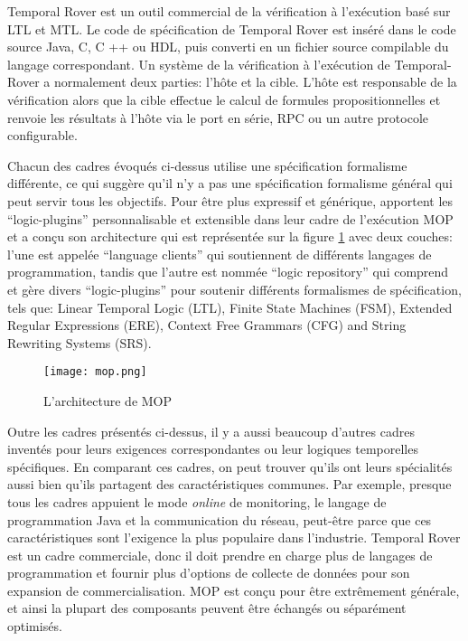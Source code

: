 Temporal Rover \citep{drusinsky2000temporal} est un outil commercial de la vérification à l'exécution basé sur LTL et MTL. Le code de spécification de Temporal Rover est inséré dans le code source Java, C, C ++ ou HDL, puis converti en un fichier source compilable du langage correspondant. Un système de la vérification à l'exécution de Temporal-Rover a normalement deux parties: l'hôte et la cible. L'hôte est responsable de la vérification alors que la cible effectue le calcul de formules propositionnelles et renvoie les résultats à l'hôte via le port en série, RPC ou un autre protocole configurable.

Chacun des cadres évoqués ci-dessus utilise une spécification formalisme différente, ce qui suggère qu'il n'y a pas une spécification formalisme général qui peut servir tous les objectifs. Pour être plus expressif et générique, \cite{chen2007mop} apportent les ``logic-plugins'' personnalisable et extensible dans leur cadre de l'exécution MOP et a conçu son architecture qui est représentée sur la figure \ref{img:mop} avec deux couches: l'une est appelée ``language clients'' qui soutiennent de différents langages de programmation, tandis que l'autre est nommée ``logic repository'' qui comprend et gère divers ``logic-plugins'' pour soutenir différents formalismes de spécification, tels que: Linear Temporal Logic (LTL), Finite State Machines (FSM), Extended Regular Expressions (ERE), Context Free Grammars (CFG) and String Rewriting Systems (SRS).

\begin{figure}[h]
\begin{center}
\centering
\texttt{[image: mop.png]}
\caption{L'architecture de MOP \citep{chen2007mop}}
\label{img:mop}
\end{center}
\end{figure}

Outre les cadres présentés ci-dessus, il y a aussi beaucoup d'autres cadres inventés pour leurs exigences correspondantes ou leur logiques temporelles spécifiques. En comparant ces cadres, on peut trouver qu'ils ont leurs spécialités aussi bien qu'ils partagent des caractéristiques communes. Par exemple, presque tous les cadres appuient le mode \emph{online} de monitoring, le langage de programmation Java et la communication du réseau, peut-être parce que ces caractéristiques sont l'exigence la plus populaire dans l'industrie. Temporal Rover est un cadre commerciale, donc il doit prendre en charge plus de langages de programmation et fournir plus d'options de collecte de données pour son expansion de commercialisation. MOP est conçu pour être extrêmement générale, et ainsi la plupart des composants peuvent être échangés ou séparément optimisés.
